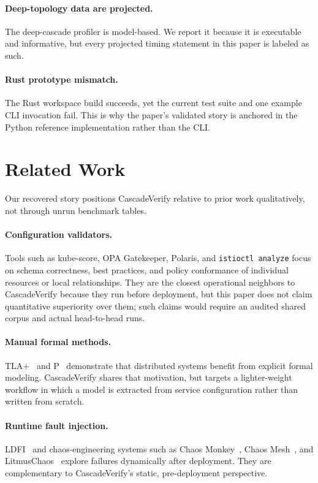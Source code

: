 \documentclass[10pt,twocolumn]{article}
\begin{document}
\paragraph{Deep-topology data are projected.}
The deep-cascade profiler is model-based.  We report it because it is executable
and informative, but every projected timing statement in this paper is labeled
as such.

\paragraph{Rust prototype mismatch.}
The Rust workspace build succeeds, yet the current test suite and one example
CLI invocation fail.  This is why the paper's validated story is anchored in
the Python reference implementation rather than the CLI.

\section{Related Work}
\label{sec:related}

Our recovered story positions CascadeVerify relative to prior work
qualitatively, not through unrun benchmark tables.

\paragraph{Configuration validators.}
Tools such as kube-score, OPA Gatekeeper, Polaris, and
\texttt{istioctl analyze} focus on schema correctness, best practices, and
policy conformance of individual resources or local relationships.  They are the
closest operational neighbors to CascadeVerify because they run before
deployment, but this paper does not claim quantitative superiority over them;
such claims would require an audited shared corpus and actual head-to-head runs.

\paragraph{Manual formal methods.}
TLA+~\cite{lamport2002,newcombe2015amazon} and P~\cite{desai2013p} demonstrate
that distributed systems benefit from explicit formal modeling.  CascadeVerify
shares that motivation, but targets a lighter-weight workflow in which a model
is extracted from service configuration rather than written from scratch.

\paragraph{Runtime fault injection.}
LDFI~\cite{alvaro2015} and chaos-engineering systems such as Chaos
Monkey~\cite{chaosmonkey}, Chaos Mesh~\cite{chaosmesh}, and
LitmusChaos~\cite{litmus2020} explore failures dynamically after deployment.
They are complementary to CascadeVerify's static, pre-deployment perspective.
\end{document}

